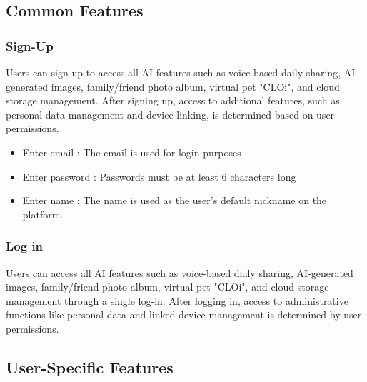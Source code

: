     \subsection{Common Features}
        \subsubsection{Sign-Up}
            Users can sign up to access all AI features such as voice-based daily sharing, AI-generated images, family/friend photo album, virtual pet "CLOi", and cloud storage management. After signing up, access to additional features, such as personal data management and device linking, is determined based on user permissions.
            \begin{itemize}
                \item Enter email : The email is used for login purposes
                \item Enter password : Passwords must be at least 6 characters long
                \item Enter name : The name is used as the user's default nickname on the platform.
            \end{itemize}

        \subsubsection{Log in}
            Users can access all AI features such as voice-based daily sharing, AI-generated images, family/friend photo album, virtual pet "CLOi", and cloud storage management through a single log-in. After logging in, access to administrative functions like personal data and linked device management is determined by user permissions.


    \subsection{User-Specific Features}
